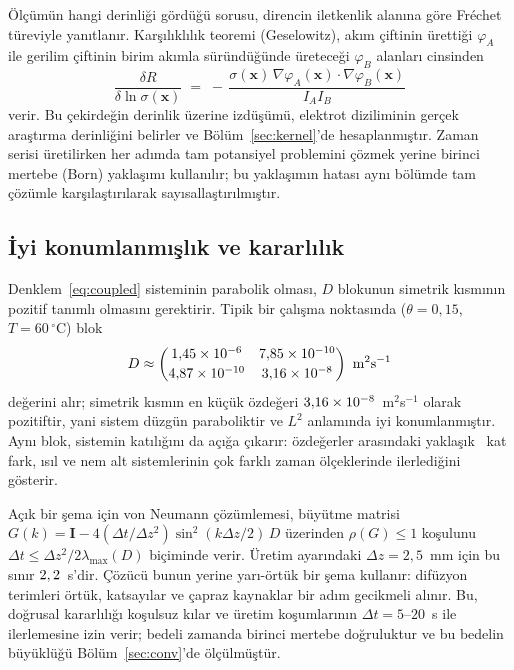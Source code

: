\documentclass[11pt,a4paper]{article}
\begin{document}
Ölçümün hangi derinliği gördüğü sorusu, direncin iletkenlik alanına göre
Fréchet türeviyle yanıtlanır. Karşılıklılık teoremi (Geselowitz), akım
çiftinin ürettiği $\varphi_A$ ile gerilim çiftinin birim akımla süründüğünde
üreteceği $\varphi_B$ alanları cinsinden
\begin{equation}
\frac{\delta R}{\delta \ln\sigma(\mathbf{x})}
\;=\; -\,\frac{\sigma(\mathbf{x})\,\nabla\varphi_A(\mathbf{x})\cdot
\nabla\varphi_B(\mathbf{x})}{I_A I_B}
\label{eq:sensitivity}
\end{equation}
verir. Bu çekirdeğin derinlik üzerine izdüşümü, elektrot diziliminin gerçek
araştırma derinliğini belirler ve Bölüm~\ref{sec:kernel}'de hesaplanmıştır.
Zaman serisi üretilirken her adımda tam potansiyel problemini çözmek yerine
birinci mertebe (Born) yaklaşımı kullanılır; bu yaklaşımın hatası aynı bölümde
tam çözümle karşılaştırılarak sayısallaştırılmıştır.

\subsection{İyi konumlanmışlık ve kararlılık}

Denklem~\eqref{eq:coupled} sisteminin parabolik olması, $D$ blokunun simetrik
kısmının pozitif tanımlı olmasını gerektirir. Tipik bir çalışma noktasında
($\theta = 0{,}15$, $T = 60\,^\circ$C) blok
\[
D \approx
\begin{pmatrix}
1{,}45\times 10^{-6} & 7{,}85\times 10^{-10}\\[.2em]
4{,}87\times 10^{-10} & 3{,}16\times 10^{-8}
\end{pmatrix}\ \mathrm{m^2 s^{-1}}
\]
değerini alır; simetrik kısmın en küçük özdeğeri $3{,}16\times 10^{-8}$~m$^2$s$^{-1}$
olarak pozitiftir, yani sistem düzgün paraboliktir ve $L^2$ anlamında iyi
konumlanmıştır. Aynı blok, sistemin katılığını da açığa çıkarır: özdeğerler
arasındaki yaklaşık \stiffRatio\ kat fark, ısıl ve nem alt sistemlerinin çok
farklı zaman ölçeklerinde ilerlediğini gösterir.

Açık bir şema için von Neumann çözümlemesi, büyütme matrisi
$G(k) = \mathbf{I} - 4(\Delta t/\Delta z^2)\sin^2(k\Delta z/2)\,D$ üzerinden
$\rho(G)\le 1$ koşulunu $\Delta t \le \Delta z^2/2\lambda_{\max}(D)$ biçiminde
verir. Üretim ayarındaki $\Delta z = 2{,}5$~mm için bu sınır
$2,2$~s'dir. Çözücü bunun yerine yarı-örtük bir şema kullanır: difüzyon
terimleri örtük, katsayılar ve çapraz kaynaklar bir adım gecikmeli alınır. Bu,
doğrusal kararlılığı koşulsuz kılar ve üretim koşumlarının $\Delta t = 5$--$20$~s
ile ilerlemesine izin verir; bedeli zamanda birinci mertebe doğruluktur ve bu
bedelin büyüklüğü Bölüm~\ref{sec:conv}'de ölçülmüştür.
\end{document}
